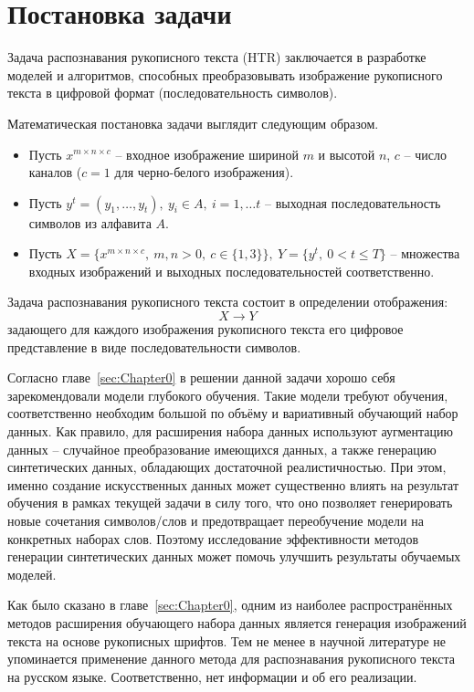 \section{Постановка задачи}
\label{sec:Chapter1} 

Задача распознавания рукописного текста (HTR) заключается в разработке моделей и алгоритмов,
способных преобразовывать изображение рукописного текста в цифровой формат (последовательность символов).

Математическая постановка задачи выглядит следующим образом.

\begin{itemize}
    \item[] Пусть $x^{m \times n \times c}$ -- входное изображение шириной $m$ и высотой $n$, $c$ -- число каналов ($c=1$ для черно-белого изображения).
    \item[] Пусть $y^t=(y_1,\dots,y_t),~y_i \in A,~i=1,\dots t$ -- выходная последовательность символов из алфавита $A$.
    \item[] Пусть $X=\{x^{m \times n \times c},~m,n>0,~c\in\{1,3\}\},~Y=\{y^t,~0<t\leqslant T\}$ -- множества входных изображений и выходных последовательностей соответственно.
\end{itemize}

Задача распознавания рукописного текста состоит в определении отображения:
\[ X \rightarrow Y \]
задающего для каждого изображения рукописного текста его цифровое представление в виде последовательности символов.

Согласно главе~\ref{sec:Chapter0} в решении данной задачи хорошо себя зарекомендовали модели глубокого обучения.
Такие модели требуют обучения, соответственно необходим большой по объёму и вариативный обучающий набор данных.
Как правило, для расширения набора данных используют аугментацию данных -- случайное преобразование имеющихся данных,
а также генерацию синтетических данных, обладающих достаточной реалистичностью.
При этом, именно создание искусственных данных может существенно влиять на результат обучения в рамках текущей задачи в силу того,
что оно позволяет генерировать новые сочетания символов/слов и предотвращает переобучение модели на конкретных наборах слов.
Поэтому исследование эффективности методов генерации синтетических данных может помочь улучшить результаты обучаемых моделей.

Как было сказано в главе~\ref{sec:Chapter0}, одним из наиболее распространённых методов расширения обучающего набора данных
является генерация изображений текста на основе рукописных шрифтов.
Тем не менее в научной литературе не упоминается применение данного метода для распознавания рукописного текста на русском языке.
Соответственно, нет информации и об его реализации.

